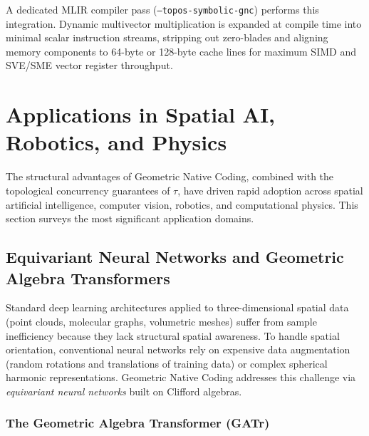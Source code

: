 \documentclass[manuscript, nonacm, review=false]{acmart}
\theoremstyle{definition}
\theoremstyle{plain}
\newcommand{\toposLang}{\ensuremath{\tau}\text{-Lang}}
\begin{document}
A dedicated MLIR compiler pass (\texttt{--topos-symbolic-gnc}) performs this integration. Dynamic multivector multiplication is expanded at compile time into minimal scalar instruction streams, stripping out zero-blades and aligning memory components to 64-byte or 128-byte cache lines for maximum SIMD and SVE/SME vector register throughput.



\section{Applications in Spatial AI, Robotics, and Physics}
\label{sec:applications}

The structural advantages of Geometric Native Coding, combined with the topological concurrency guarantees of \toposLang{}, have driven rapid adoption across spatial artificial intelligence, computer vision, robotics, and computational physics. This section surveys the most significant application domains.

\subsection{Equivariant Neural Networks and Geometric Algebra Transformers}
\label{subsec:gatr}

Standard deep learning architectures applied to three-dimensional spatial data (point clouds, molecular graphs, volumetric meshes) suffer from sample inefficiency because they lack structural spatial awareness. To handle spatial orientation, conventional neural networks rely on expensive data augmentation (random rotations and translations of training data) or complex spherical harmonic representations. Geometric Native Coding addresses this challenge via \emph{equivariant neural networks} built on Clifford algebras.

\subsubsection{The Geometric Algebra Transformer (GATr)}
\end{document}
